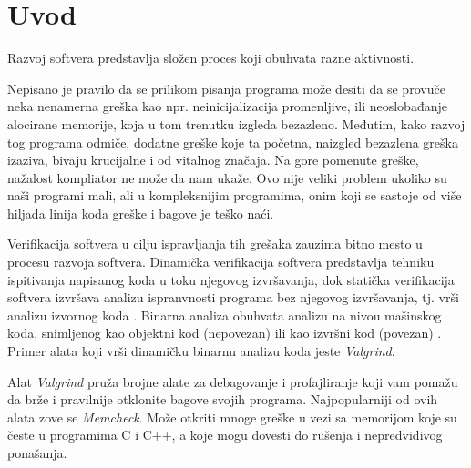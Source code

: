\documentclass[12pt,oneside]{memoir}
\theoremstyle{plain}
\theoremstyle{definition}
\begin{document}
\frontmatter
\naslovna
\komisija
\apstrakt
\tableofcontents*

\mainmatter

\chapter{Uvod}
Razvoj softvera predstavlja složen proces koji obuhvata razne aktivnosti. 

Nepisano je pravilo da se prilikom pisanja programa može desiti da se provuče neka nenamerna greška kao npr. neinicijalizacija promenljive, ili neoslobađanje alocirane memorije, koja u tom trenutku izgleda bezazleno. Međutim, kako razvoj tog programa odmiče, dodatne greške koje ta početna, naizgled bezazlena greška izaziva, bivaju krucijalne i od vitalnog značaja. Na gore pomenute greške, nažalost kompliator ne može da nam ukaže. Ovo nije veliki problem ukoliko su naši programi mali, ali u  kompleksnijim programima, onim koji se sastoje od više hiljada linija koda greške i bagove je teško naći. 

Verifikacija softvera  u cilju ispravljanja tih grešaka zauzima bitno mesto u procesu razvoja softvera. Dinamička verifikacija softvera predstavlja tehniku ispitivanja napisanog koda u toku njegovog izvršavanja, dok statička verifikacija softvera izvršava analizu ispranvnosti programa bez njegovog izvršavanja, tj. vrši analizu izvornog koda \cite{02Motivacija}. Binarna analiza obuhvata analizu na nivou mašinskog koda, snimljenog kao objektni kod (nepovezan) ili kao izvršni kod (povezan) \cite{03DinamickaAnaliza}. Primer alata koji vrši dinamičku binarnu analizu koda jeste \textit{Valgrind}.  

Alat \textit{Valgrind} pruža brojne alate za debagovanje i profajliranje koji vam pomažu da brže i pravilnije otklonite bagove svojih programa. Najpopularniji od ovih alata zove se \textit{Memcheck}. Može otkriti mnoge greške u vezi sa memorijom koje su česte u programima C i C++, a koje mogu dovesti do rušenja i nepredvidivog ponašanja. 
\end{document}
